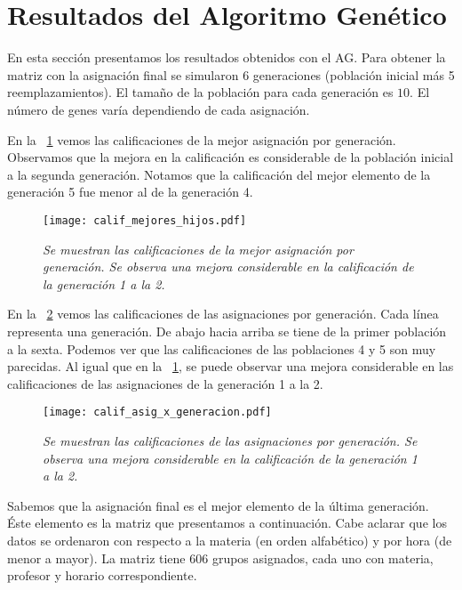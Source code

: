 \section{Resultados del Algoritmo Genético}

En esta sección presentamos los resultados obtenidos con el AG. Para obtener la matriz con la asignación final se simularon $6$ generaciones (población inicial más 5 reemplazamientos). El tamaño de la población para cada generación es $10$. El número de genes varía dependiendo de cada asignación.


En la \figurename{~\ref{EjcalifMejoresHijos}} vemos las calificaciones de la mejor asignación por generación. Observamos que la mejora en la calificación es considerable de la población inicial a la segunda generación. Notamos que la calificación del mejor elemento de la generación 5 fue menor al de la generación 4.

\begin{figure}[H]
\centering
\texttt{[image: calif\_mejores\_hijos.pdf]} %
\caption[\textit{Calificaciones de mejores asignaciones}]{\textit{Se muestran las calificaciones de la mejor asignación por generación. Se observa una mejora considerable en la calificación de la generación 1 a la 2.}}\label{EjcalifMejoresHijos}
\end{figure}

%

En la \figurename{~\ref{EjcalifAsig_x_generacion}} vemos las calificaciones de las asignaciones por generación. Cada línea representa una generación. De abajo hacia arriba se tiene de la primer población a la sexta. Podemos ver que las calificaciones de las poblaciones 4 y 5 son muy parecidas. Al igual que en la \figurename{~\ref{EjcalifMejoresHijos}}, se puede observar una mejora considerable en las calificaciones de las asignaciones de la generación 1 a la 2.

\begin{figure}[H]
\centering
\texttt{[image: calif\_asig\_x\_generacion.pdf]} %
\caption[\textit{Calificaciones de asignaciones por generación}]{\textit{Se muestran las calificaciones de las asignaciones por generación. Se observa una mejora considerable en la calificación de la generación 1 a la 2.}}\label{EjcalifAsig_x_generacion}
\end{figure}


Sabemos que la asignación final es el mejor elemento de la última generación. Éste elemento es la matriz que presentamos a continuación. Cabe aclarar que los datos se ordenaron con respecto a la materia (en orden alfabético) y por hora (de menor a mayor). La matriz tiene 606 grupos asignados, cada uno con materia, profesor y horario correspondiente.

\dfNmatAsigFinal